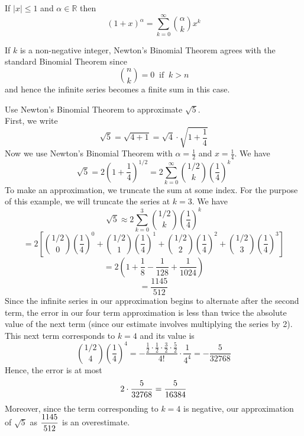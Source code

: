 \documentclass[handout]{ximera}
\begin{document}
\begin{theorem}
If $|x| \leq 1$ and $\alpha \in \mathbb{R}$ then
\[
(1+x)^\alpha = \sum_{k = 0}^\infty \binom{\alpha}{k}x^k
\]
\end{theorem}

\begin{remark} If $k$ is a non-negative integer, Newton's Binomial Theorem agrees with the standard Binomial Theorem since 
\[
\binom{n}{k} = 0 \;\; \text{if} \;\; k > n
\]
and hence the infinite series becomes a finite sum in this case.
\end{remark}


\begin{example}[example 2]
Use Newton's Binomial Theorem to approximate $\sqrt 5$.\\
First, we write 
\[
\sqrt 5 = \sqrt{4+1} = \sqrt{4}\cdot \sqrt{1+\frac{1}{4}}
\]
Now we use Newton's Binomial Theorem with $\alpha = \frac12$ and $x = \frac14$.
We have
\[
\sqrt 5 = 2\left(1+\frac14\right)^{1/2} = 2\sum_{k=0}^\infty \binom{1/2}{k} \left(\frac14\right)^k
\]
To make an approximation, we truncate the sum at some index.  For the purpose of this example, we will truncate the series at $k = 3$. We have
\[
\sqrt 5 \approx 2\sum_{k=0}^3 \binom{1/2}{k} \left(\frac14\right)^k 
\]
\[
= 2\left[\binom{1/2}{0} \left(\frac14\right)^0 +\binom{1/2}{1} \left(\frac14\right)^1 + \binom{1/2}{2} \left(\frac14\right)^2 + \binom{1/2}{3} \left(\frac14\right)^3 \right]
\]
\[
= 2\left(1 + \frac18 - \frac{1}{128} + \frac{1}{1024}\right)
\]
\[
= \frac{1145}{512}
\]
Since the infinite series in our approximation begins to alternate after the second term, 
the error in our four term approximation is less than twice the absolute value of the next term (since our estimate involves multiplying the series by 2). 
This next term corresponds to $k= 4$ and its value is 
\[
\binom{1/2}{4}\left(\frac14\right)^4 = -\frac{\frac12\cdot \frac12\cdot \frac32 \cdot\frac52}{4!}\cdot \frac{1}{4^4}
 = -\frac{5}{32768}
\]
Hence, the error is at most 
\[
\displaystyle 2 \cdot \frac{5}{32768} = \frac{5}{16384}
\]
Moreover, since the term corresponding to $k = 4$ is negative, our approximation of $\sqrt 5$ 
as $\displaystyle \frac{1145}{512}$ is an overestimate.
\end{example}
\end{document}
